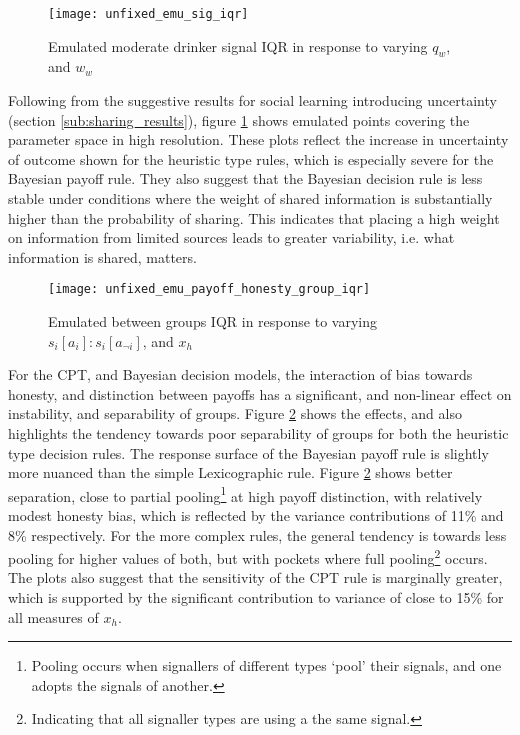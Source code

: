 \begin{figure}[H]
\texttt{[image: unfixed\_emu\_sig\_iqr]}
\caption{Emulated moderate drinker signal IQR in response to varying \(q_{w}\), and \(w_{w}\)}
\label{fig:emulated_sharing_iqr}
\end{figure}

Following from the suggestive results for social learning introducing uncertainty (section \ref{sub:sharing_results}), figure \ref{fig:emulated_sharing_iqr} shows emulated points covering the parameter space in high resolution. These plots reflect the increase in uncertainty of outcome shown for the heuristic type rules, which is especially severe for the Bayesian payoff rule. They also suggest that the Bayesian decision rule is less stable under conditions where the weight of shared information is substantially higher than the probability of sharing. This indicates that placing a high weight on information from limited sources leads to greater variability, i.e. what information is shared, matters.

\begin{figure}[H]
\texttt{[image: unfixed\_emu\_payoff\_honesty\_group\_iqr]}
\caption{Emulated between groups IQR in response to varying \(s_{i}[a_{i}]:s_{i}[a_{\neg i}]\), and \(x_{h}\)}
\label{fig:emulated_payoff_group_iqr}
\end{figure}

For the \ac{CPT}, and Bayesian decision models, the interaction of bias towards honesty, and distinction between payoffs has a significant, and non-linear effect on instability, and separability of groups. Figure \ref{fig:emulated_payoff_group_iqr} shows the effects, and also highlights the tendency towards poor separability of groups for both the heuristic type decision rules. The response surface of the Bayesian payoff rule is slightly more nuanced than the simple Lexicographic rule. Figure \ref{fig:emulated_payoff_group_iqr} shows better separation, close to partial pooling\footnote{Pooling occurs when signallers of different types `pool' their signals, and one adopts the signals of another.} at high payoff distinction, with relatively modest honesty bias, which is reflected by the variance contributions of 11\% and 8\% respectively.  For the more complex rules, the general tendency is towards less pooling for higher values of both, but with pockets where full pooling\footnote{Indicating that all signaller types are using a the same signal.} occurs.  The plots also suggest that the sensitivity of the \ac{CPT} rule is marginally greater, which is supported by the significant contribution to variance of close to 15\% for all measures of \(x_{h}\).
